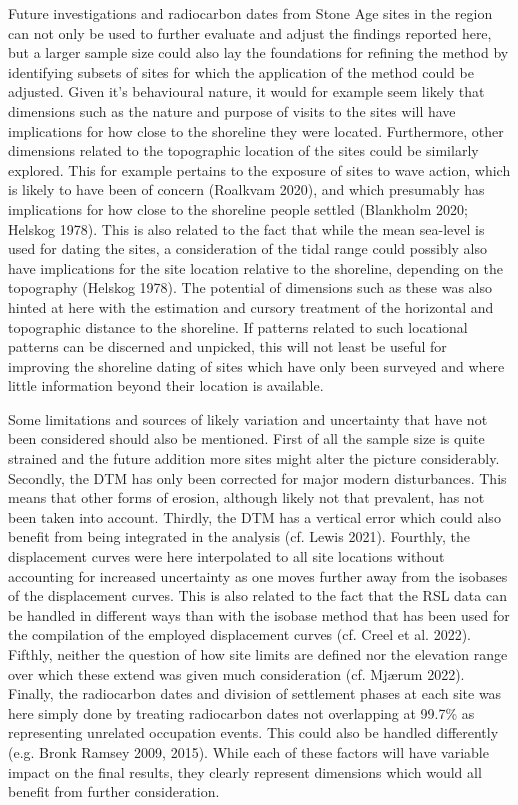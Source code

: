 \documentclass[
]{article}
\begin{document}
Future investigations and radiocarbon dates from Stone Age sites in the region can not only be used to further evaluate and adjust the findings reported here, but a larger sample size could also lay the foundations for refining the method by identifying subsets of sites for which the application of the method could be adjusted. Given it's behavioural nature, it would for example seem likely that dimensions such as the nature and purpose of visits to the sites will have implications for how close to the shoreline they were located. Furthermore, other dimensions related to the topographic location of the sites could be similarly explored. This for example pertains to the exposure of sites to wave action, which is likely to have been of concern (Roalkvam 2020), and which presumably has implications for how close to the shoreline people settled (Blankholm 2020; Helskog 1978). This is also related to the fact that while the mean sea-level is used for dating the sites, a consideration of the tidal range could possibly also have implications for the site location relative to the shoreline, depending on the topography (Helskog 1978). The potential of dimensions such as these was also hinted at here with the estimation and cursory treatment of the horizontal and topographic distance to the shoreline. If patterns related to such locational patterns can be discerned and unpicked, this will not least be useful for improving the shoreline dating of sites which have only been surveyed and where little information beyond their location is available.

Some limitations and sources of likely variation and uncertainty that have not been considered should also be mentioned. First of all the sample size is quite strained and the future addition more sites might alter the picture considerably. Secondly, the DTM has only been corrected for major modern disturbances. This means that other forms of erosion, although likely not that prevalent, has not been taken into account. Thirdly, the DTM has a vertical error which could also benefit from being integrated in the analysis (cf. Lewis 2021). Fourthly, the displacement curves were here interpolated to all site locations without accounting for increased uncertainty as one moves further away from the isobases of the displacement curves. This is also related to the fact that the RSL data can be handled in different ways than with the isobase method that has been used for the compilation of the employed displacement curves (cf. Creel et al. 2022). Fifthly, neither the question of how site limits are defined nor the elevation range over which these extend was given much consideration (cf. Mjærum 2022). Finally, the radiocarbon dates and division of settlement phases at each site was here simply done by treating radiocarbon dates not overlapping at 99.7\% as representing unrelated occupation events. This could also be handled differently (e.g. Bronk Ramsey 2009, 2015). While each of these factors will have variable impact on the final results, they clearly represent dimensions which would all benefit from further consideration.
\end{document}
